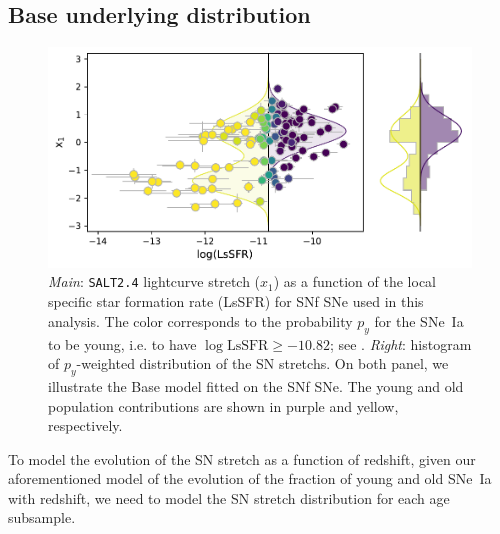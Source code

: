 \documentclass[]{aa} %
\newcommand{\nn}[1]{{\textcolor[rgb]{1, 0.27, 0}{#1}}}
\begin{document}
\subsection{\nn{Base underlying distribution}}
\label{sec:basemodel}

\begin{figure}
    \centering
    \includegraphics[width=0.8\linewidth]{Article_figures/model_base_hist.pdf}
    \caption{\textit{Main}: \textsc{\texttt{SALT2.4}} lightcurve stretch ($x_1$) as a function of
        the local specific star formation rate (LsSFR) for SNf SNe used in this
        analysis. The color corresponds to the probability $p_y$ for the SNe~Ia to be
        young, i.e. to have $\log\mathrm{LsSFR} \geq -10.82$; see
        \cite{rigault2018}. \textit{Right}: histogram of $p_y$-weighted
        distribution of the SN stretchs. On both panel, we illustrate the
        Base model fitted on the SNf SNe. The young and old population
        contributions are shown in purple and yellow, respectively.}
    \label{fig:stretchlssfr}
\end{figure}

To model the evolution of the SN stretch
as a function of redshift, given our aforementioned model of the evolution of
the fraction of young and old SNe~Ia with redshift, we need to model the SN
stretch distribution for each age subsample. 
\end{document}
